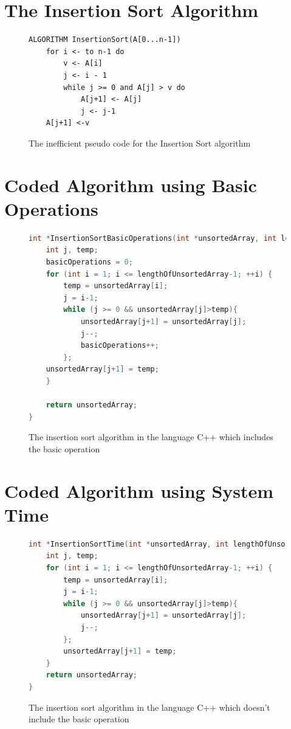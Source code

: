 \documentclass[12pt]{article}
\begin{document}
\begin{appendices}
\section{The Insertion Sort Algorithm}
\begin{figure}[h]
\begin{lstlisting}
ALGORITHM InsertionSort(A[0...n-1])
	for i <- to n-1 do
		v <- A[i]
		j <- i - 1
		while j >= 0 and A[j] > v do
			A[j+1] <- A[j]
			j <- j-1
	A[j+1] <-v
\end{lstlisting}
\caption{\label{the-algorithm-psuedo} The inefficient pseudo code for the Insertion Sort algorithm}
\end{figure}

\newpage	

\section{Coded Algorithm using Basic Operations}
\label{coded-algo-basic}
\begin{figure}[h]
\begin{lstlisting}[language=C++, breaklines=true]
int *InsertionSortBasicOperations(int *unsortedArray, int lengthOfUnsortedArray) {
	int j, temp;
	basicOperations = 0;
	for (int i = 1; i <= lengthOfUnsortedArray-1; ++i) {
		temp = unsortedArray[i];
		j = i-1;
		while (j >= 0 && unsortedArray[j]>temp){
			unsortedArray[j+1] = unsortedArray[j];
			j--;
			basicOperations++;
		};
	unsortedArray[j+1] = temp;
	}

	return unsortedArray;
}
\end{lstlisting}
\caption{\label{insertion-sort-basic} The insertion sort algorithm in the language C++ which includes the basic operation}
\end{figure}

\newpage
\section{Coded Algorithm using System Time}
\begin{figure}[h]
\begin{lstlisting}[language=C++, breaklines=true]
int *InsertionSortTime(int *unsortedArray, int lengthOfUnsortedArray) {
	int j, temp;
	for (int i = 1; i <= lengthOfUnsortedArray-1; ++i) {
		temp = unsortedArray[i];
		j = i-1;
		while (j >= 0 && unsortedArray[j]>temp){
			unsortedArray[j+1] = unsortedArray[j];
			j--;
		};
		unsortedArray[j+1] = temp;
	}
	return unsortedArray;
}
\end{lstlisting}
\caption{\label{coded-algo-time} The insertion sort algorithm in the language C++ which doesn't include the basic operation}
\end{figure}
\newpage


\end{appendices}
\end{document}
